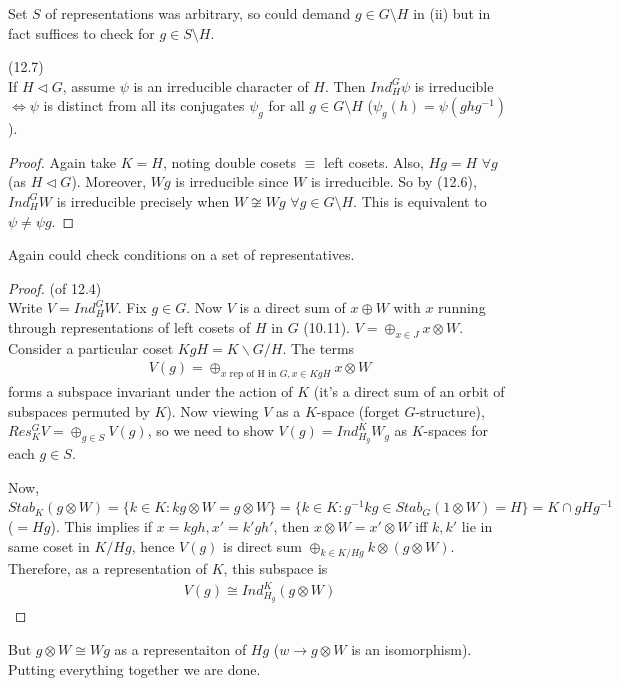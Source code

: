 \documentclass[a4paper]{article}
\begin{document}
\begin{rem}
Set $S$ of representations was arbitrary, so could demand $g \in G \setminus H$ in (ii) but in fact suffices to check for $g \in S \setminus H$.
\end{rem}

\begin{coro} (12.7)\\
If $H \triangleleft G$, assume $\psi$ is an irreducible character of $H$. Then $Ind_H^G \psi$ is irreducible $\iff \psi$ is distinct from all its conjugates $\psi_g$ for all $g \in G\setminus H$ ($\psi_g(h) = \psi(ghg^{-1})$).
\begin{proof}
Again take $K=H$, noting double cosets $\equiv$ left cosets. Also, $Hg = H$ $\forall g$ (as $H \triangleleft G$). Moreover, $Wg$ is irreducible since $W$ is irreducible. So by (12.6), $Ind_H^G W$ is irreducible precisely when $W \not\cong Wg$ $\forall g \in G \setminus H$. This is equivalent to $\psi \neq \psi g$.
\end{proof}
\end{coro}

\begin{rem}
Again could check conditions on a set of representatives.
\end{rem}

\begin{proof} (of 12.4)\\
Write $V = Ind_H^G W$. Fix $g \in G$. Now $V$ is a direct sum of $x \oplus W$ with $x$ running through representations of left cosets of $H$ in $G$ (10.11). $V = \oplus_{x \in J} x \otimes W$.\\
Consider a particular coset $KgH = K\backslash G/H$. The terms
\begin{equation*}
\begin{aligned}
V(g) = \oplus_{x\text{ rep of H in } G, x \in KgH} x \otimes W
\end{aligned}
\end{equation*}
forms a subspace invariant under the action of $K$ (it's a direct sum of an orbit of subspaces permuted by $K$). Now viewing $V$ as a $K$-space (forget $G$-structure), $Res_K^G V = \oplus_{g \in S} V(g)$, so we need to show $V(g) = Ind_{H_g}^K W_g$ as $K$-spaces for each $g \in S$.

Now, $Stab_K (g \otimes W) = \{k \in K: kg \otimes W = g \otimes W\} = \{k \in K: g^{-1} kg \in Stab_G (1 \otimes W) = H\} = K \cap gHg^{-1}$ ($=Hg$). This implies if $x = kgh, x' =k'gh'$, then $x \otimes W = x' \otimes W$ iff $k,k'$ lie in same coset in $K/Hg$, hence $V(g)$ is direct sum $\oplus_{k \in K/Hg} k \otimes (g \otimes W)$. Therefore, as a representation of $K$, this subspace is
\begin{equation*}
\begin{aligned}
V(g) \cong Ind_{H_g}^K (g \otimes W)
\end{aligned}
\end{equation*}
\end{proof}
But $g \otimes W \cong Wg$ as a representaiton of $Hg$ ($w \to g \otimes W$ is an isomorphism). Putting everything together we are done.
\end{document}
